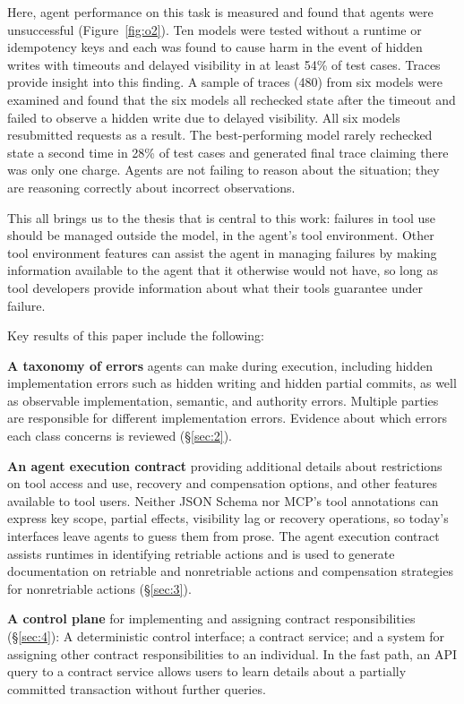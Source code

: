 \documentclass[letterpaper,twocolumn,10pt]{article}
\begin{document}
Here, agent performance on this task is measured and found that agents were unsuccessful (Figure~\ref{fig:o2}). Ten models were tested without a runtime or idempotency keys and each was found to cause harm in the event of hidden writes with timeouts and delayed visibility in at least 54\% of test cases. Traces provide insight into this finding. A sample of traces (480) from six models were examined and found that the six models all rechecked state after the timeout and failed to observe a hidden write due to delayed visibility. All six models resubmitted requests as a result. The best-performing model rarely rechecked state a second time in 28\% of test cases and generated final trace claiming there was only one charge. Agents are not failing to reason about the situation; they are reasoning correctly about incorrect observations.

This all brings us to the thesis that is central to this work: failures in tool use should be managed outside the model, in the agent's tool environment. Other tool environment features can assist the agent in managing failures by making information available to the agent that it otherwise would not have, so long as tool developers provide information about what their tools guarantee under failure.

Key results of this paper include the following:

\textbf{A taxonomy of errors} agents can make during execution, including hidden implementation errors such as hidden writing and hidden partial commits, as well as observable implementation, semantic, and authority errors. Multiple parties are responsible for different implementation errors. Evidence about which errors each class concerns is reviewed (\S\ref{sec:2}).

\textbf{An agent execution contract} providing additional details about restrictions on tool access and use, recovery and compensation options, and other features available to tool users. Neither JSON Schema nor MCP's tool annotations can express key scope, partial effects, visibility lag or recovery operations, so today's interfaces leave agents to guess them from prose. The agent execution contract assists runtimes in identifying retriable actions and is used to generate documentation on retriable and nonretriable actions and compensation strategies for nonretriable actions (\S\ref{sec:3}).

\textbf{A control plane} for implementing and assigning contract responsibilities (\S\ref{sec:4}): A deterministic control interface; a contract service; and a system for assigning other contract responsibilities to an individual. In the fast path, an API query to a contract service allows users to learn details about a partially committed transaction without further queries.
\end{document}
